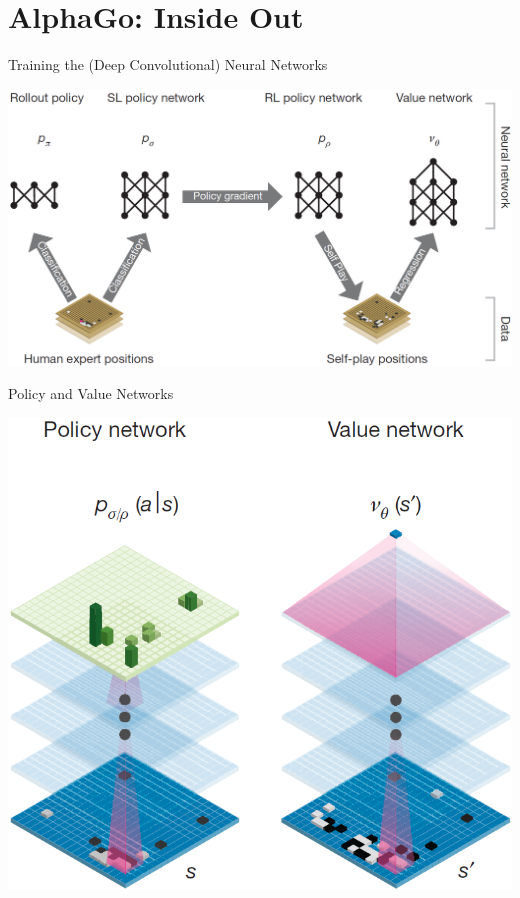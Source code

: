 \documentclass{beamer}
\begin{document}
  \section{AlphaGo: Inside Out}
  {
    \begin{frame}{Training the (Deep Convolutional) Neural Networks}
      \begin{center}
        \includegraphics[width=\textwidth]{../img/neural_nets_pipeline.png}
      \end{center}
    \end{frame}

    \begin{frame}{Policy and Value Networks}
      \begin{center}
        \includegraphics[height=.85\textheight]{../img/policy_and_value_network.png}
      \end{center}
    \end{frame}

}
\end{document}
